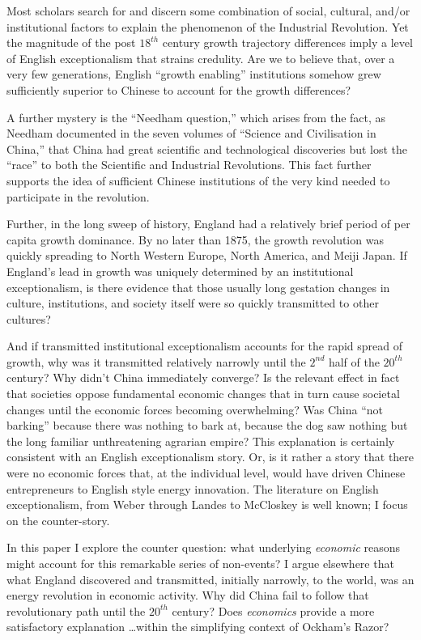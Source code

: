 \documentclass[12pt]{article}
\numberwithin{equation}{section}
\begin{document}
	Most scholars search for and discern some combination of social, cultural, and/or institutional factors to explain the phenomenon of the Industrial Revolution. Yet the magnitude of the post $18^{th}$ century growth trajectory differences imply a level of English exceptionalism that strains credulity. Are we to believe that, over a very few generations, English ``growth enabling'' institutions somehow grew sufficiently superior to Chinese to account for the growth differences?
	
	A further mystery is the ``Needham question,'' which arises from the fact, as Needham documented in the seven volumes of ``Science and Civilisation in China,'' that China had great scientific and technological discoveries but lost the ``race'' to both the Scientific and Industrial Revolutions. This fact further supports the idea of sufficient Chinese institutions of the very kind needed to participate in the revolution.
	
	Further, in the long sweep of history, England had a relatively brief period of per capita growth dominance. By no later than 1875, the growth revolution was quickly spreading to North Western Europe, North America, and Meiji Japan. If England's lead in growth was uniquely determined by an institutional exceptionalism, is there evidence that those usually long gestation changes in culture, institutions, and society itself were so quickly transmitted to other cultures?
	
	And if transmitted institutional exceptionalism accounts for the rapid spread of growth, why was it transmitted relatively narrowly until the $2^{nd}$ half of the $20^{th}$ century? Why didn't China immediately converge? Is the relevant effect in fact that societies oppose fundamental economic changes that in turn cause societal changes until the economic forces becoming overwhelming? Was China ``not barking'' because there was nothing to bark at, because the dog saw nothing but the long familiar unthreatening agrarian empire? This explanation is certainly consistent with an English exceptionalism story. Or, is it rather a story that there were no economic forces that, at the individual level, would have driven Chinese entrepreneurs to English style energy innovation. The literature on English exceptionalism, from Weber through Landes to McCloskey is well known; I focus on the counter-story.
	
	In this paper I explore the counter question: what underlying \textit{economic} reasons might account for this remarkable series of non-events? I argue elsewhere that what England discovered and transmitted, initially  narrowly, to the world, was an energy revolution in economic activity. Why did China fail to follow that revolutionary path until the $20^{th}$ century? Does \textit{economics} provide a more satisfactory explanation \ldots within the simplifying context of Ockham's Razor?
	
\end{document}
